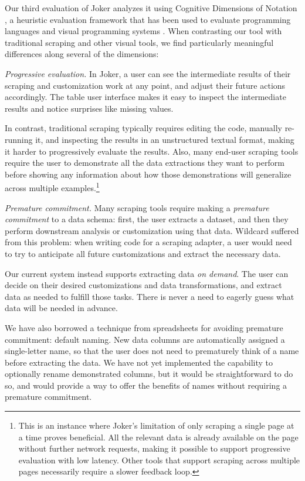 \documentclass[sigconf,10pt]{acmart}
\begin{document}
Our third evaluation of Joker analyzes it using Cognitive Dimensions of
Notation \citep{blackwell2001}, a heuristic evaluation framework that
has been used to evaluate programming languages and visual programming
systems \citep{satyanarayan2014, satyanarayan2014a, ledo2018}. When
contrasting our tool with traditional scraping and other visual tools,
we find particularly meaningful differences along several of the
dimensions:

\emph{Progressive evaluation.} In Joker, a user can see the intermediate
results of their scraping and customization work at any point, and
adjust their future actions accordingly. The table user interface makes
it easy to inspect the intermediate results and notice surprises like
missing values.

In contrast, traditional scraping typically requires editing the code,
manually re-running it, and inspecting the results in an unstructured
textual format, making it harder to progressively evaluate the results.
Also, many end-user scraping tools \citep{chasins2018, lin2009} require
the user to demonstrate all the data extractions they want to perform
before showing any information about how those demonstrations will
generalize across multiple examples.\footnote{This is an instance where
  Joker's limitation of only scraping a single page at a time proves
  beneficial. All the relevant data is already available on the page
  without further network requests, making it possible to support
  progressive evaluation with low latency. Other tools that support
  scraping across multiple pages necessarily require a slower feedback
  loop.}

\emph{Premature commitment.} Many scraping tools require making a
\emph{premature commitment} to a data schema: first, the user extracts a
dataset, and then they perform downstream analysis or customization
using that data. Wildcard suffered from this problem: when writing code
for a scraping adapter, a user would need to try to anticipate all
future customizations and extract the necessary data.

Our current system instead supports extracting data \emph{on demand}.
The user can decide on their desired customizations and data
transformations, and extract data as needed to fulfill those tasks.
There is never a need to eagerly guess what data will be needed in
advance.

We have also borrowed a technique from spreadsheets for avoiding
premature commitment: default naming. New data columns are automatically
assigned a single-letter name, so that the user does not need to
prematurely think of a name before extracting the data. We have not yet
implemented the capability to optionally rename demonstrated columns,
but it would be straightforward to do so, and would provide a way to
offer the benefits of names without requiring a premature commitment.
\end{document}
